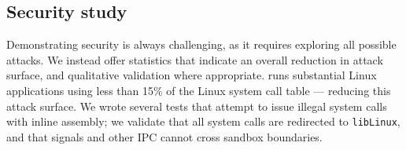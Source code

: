 



\subsection{Security study}

Demonstrating security is always challenging, as it requires exploring all possible attacks.
We instead offer statistics that indicate an overall reduction in attack surface,
and qualitative validation where appropriate.
\graphene{} runs substantial Linux applications using less than 15\% of the
Linux system call table
--- reducing this attack surface.
We wrote several tests that attempt to issue illegal system calls with inline assembly;
we validate that all system calls are redirected to {\tt libLinux},
and that signals and other IPC cannot cross sandbox boundaries.





